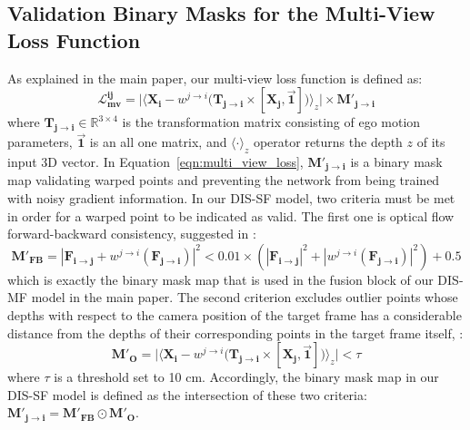 \subsection{Validation Binary Masks for the Multi-View Loss Function} \label{sec:c2_binary_masks}
As explained in the main paper, our multi-view loss function is defined as:
\begin{equation} \label{eqn:multi_view_loss}
    \boldsymbol{\mathcal{L}^{ij}_{mv}}=
    \bigg|
    \Big \langle \boldsymbol{X_{i}} -
    w^{j \rightarrow i}
    \big( \boldsymbol{T_{j \rightarrow i}} \times [\boldsymbol{X_{j}},\vec{\mathbf{1}}] \big) \Big \rangle_z
    \bigg| \times \boldsymbol{M'_{j \rightarrow i}}
\end{equation}
where $\boldsymbol{T_{j \rightarrow i}} \in \mathbb{R}^{3 \times 4}$ is the transformation matrix consisting of ego motion parameters, $\vec{\mathbf{1}}$ is an all one matrix, and $\langle\cdot\rangle_z$ operator returns the depth $z$ of its input 3D vector. In Equation~\ref{eqn:multi_view_loss}, $\boldsymbol{M'_{j \rightarrow i}}$ is a binary mask map validating warped points and preventing the network from being trained with noisy gradient information. In our DIS-SF model, two criteria must be met in order for a warped point to be indicated as valid. The first one is optical flow forward-backward consistency, suggested in \cite{zou2018df,meister2017unflow}:
\begin{equation}\label{eqn:supp_flow_forward_backward}
    \boldsymbol{M'_{FB}} = |\boldsymbol{F_{i \rightarrow j}} + w^{j \rightarrow i}(\boldsymbol{F_{j \rightarrow i}})|^2 < 0.01 \times (|\boldsymbol{F_{i \rightarrow j}}|^2 + |w^{j \rightarrow i}(\boldsymbol{F_{j \rightarrow i}})|^2) + 0.5
\end{equation}
which is exactly the binary mask map that is used in the fusion block of our DIS-MF model in the main paper. The second criterion excludes outlier points whose depths with respect to the camera position of the target frame has a considerable distance from the depths of their corresponding points in the target frame itself, \ie:
\begin{equation}
    \boldsymbol{M'_{O}} = \bigg|
    \Big \langle \boldsymbol{X_{i}} -
    w^{j \rightarrow i}
    \big( \boldsymbol{T_{j \rightarrow i}} \times [\boldsymbol{X_{j}},\vec{\mathbf{1}}] \big) \Big \rangle_z
    \bigg| < \tau
\end{equation}
where $\tau$ is a threshold set to 10 cm. Accordingly, the binary mask map in our DIS-SF model is defined as the intersection of these two criteria: $\boldsymbol{M'_{j \rightarrow i}} = \boldsymbol{M'_{FB}} \odot \boldsymbol{M'_{O}}$.

